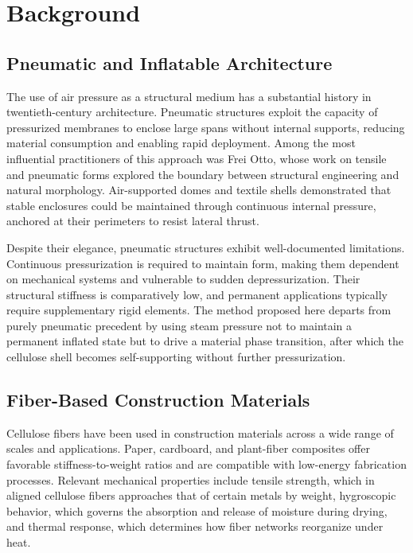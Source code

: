 \documentclass[12pt,a4paper]{article}
\begin{document}
\section{Background}

\subsection{Pneumatic and Inflatable Architecture}

The use of air pressure as a structural medium has a substantial
history in twentieth-century architecture. Pneumatic structures exploit
the capacity of pressurized membranes to enclose large spans without
internal supports, reducing material consumption and enabling rapid
deployment. Among the most influential practitioners of this approach
was Frei Otto, whose work on tensile and pneumatic forms explored the
boundary between structural engineering and natural morphology. Air-supported
domes and textile shells demonstrated that stable enclosures could be
maintained through continuous internal pressure, anchored at their
perimeters to resist lateral thrust.

Despite their elegance, pneumatic structures exhibit well-documented
limitations. Continuous pressurization is required to maintain form,
making them dependent on mechanical systems and vulnerable to sudden
depressurization. Their structural stiffness is comparatively low, and
permanent applications typically require supplementary rigid elements.
The method proposed here departs from purely pneumatic precedent by
using steam pressure not to maintain a permanent inflated state but to
drive a material phase transition, after which the cellulose shell
becomes self-supporting without further pressurization.

\subsection{Fiber-Based Construction Materials}

Cellulose fibers have been used in construction materials across a wide
range of scales and applications. Paper, cardboard, and plant-fiber
composites offer favorable stiffness-to-weight ratios and are compatible
with low-energy fabrication processes. Relevant mechanical properties
include tensile strength, which in aligned cellulose fibers approaches
that of certain metals by weight, hygroscopic behavior, which governs
the absorption and release of moisture during drying, and thermal
response, which determines how fiber networks reorganize under heat.
\end{document}
